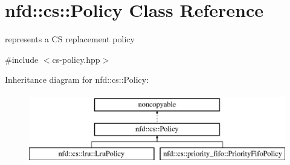 \hypertarget{classnfd_1_1cs_1_1Policy}{}\section{nfd\+:\+:cs\+:\+:Policy Class Reference}
\label{classnfd_1_1cs_1_1Policy}


represents a CS replacement policy  




{\ttfamily \#include $<$cs-\/policy.\+hpp$>$}

Inheritance diagram for nfd\+:\+:cs\+:\+:Policy\+:\begin{figure}[H]
\begin{center}
\leavevmode
\includegraphics[height=3.000000cm]{classnfd_1_1cs_1_1Policy}
\end{center}
\end{figure}
